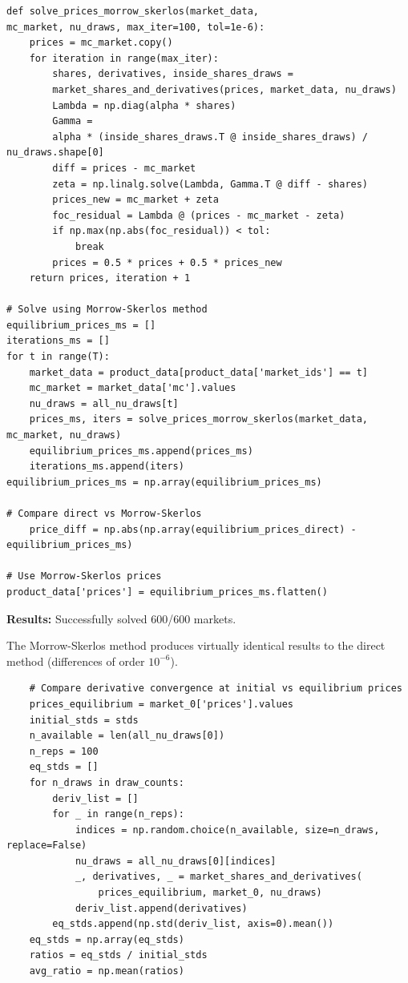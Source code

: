 \documentclass[english,11pt]{article}
\begin{document}
\begin{enumerate}
\begin{enumerate}
\begin{verbatim}
def solve_prices_morrow_skerlos(market_data,
mc_market, nu_draws, max_iter=100, tol=1e-6):
    prices = mc_market.copy()
    for iteration in range(max_iter):
        shares, derivatives, inside_shares_draws = 
        market_shares_and_derivatives(prices, market_data, nu_draws)
        Lambda = np.diag(alpha * shares)
        Gamma = 
        alpha * (inside_shares_draws.T @ inside_shares_draws) / nu_draws.shape[0]
        diff = prices - mc_market
        zeta = np.linalg.solve(Lambda, Gamma.T @ diff - shares)
        prices_new = mc_market + zeta
        foc_residual = Lambda @ (prices - mc_market - zeta)
        if np.max(np.abs(foc_residual)) < tol:
            break
        prices = 0.5 * prices + 0.5 * prices_new
    return prices, iteration + 1
    
# Solve using Morrow-Skerlos method
equilibrium_prices_ms = []
iterations_ms = []
for t in range(T):
    market_data = product_data[product_data['market_ids'] == t]
    mc_market = market_data['mc'].values
    nu_draws = all_nu_draws[t]
    prices_ms, iters = solve_prices_morrow_skerlos(market_data, mc_market, nu_draws)
    equilibrium_prices_ms.append(prices_ms)
    iterations_ms.append(iters)
equilibrium_prices_ms = np.array(equilibrium_prices_ms)

# Compare direct vs Morrow-Skerlos 
    price_diff = np.abs(np.array(equilibrium_prices_direct) - equilibrium_prices_ms)
    
# Use Morrow-Skerlos prices
product_data['prices'] = equilibrium_prices_ms.flatten()
\end{verbatim}


\textbf{Results:} Successfully solved 600/600 markets. 

The Morrow-Skerlos method produces virtually identical results to the direct method (differences of order $10^{-6}$).


\begin{verbatim}
    # Compare derivative convergence at initial vs equilibrium prices
    prices_equilibrium = market_0['prices'].values
    initial_stds = stds 
    n_available = len(all_nu_draws[0])
    n_reps = 100
    eq_stds = []
    for n_draws in draw_counts:
        deriv_list = []
        for _ in range(n_reps):
            indices = np.random.choice(n_available, size=n_draws, replace=False)
            nu_draws = all_nu_draws[0][indices]
            _, derivatives, _ = market_shares_and_derivatives(
                prices_equilibrium, market_0, nu_draws)
            deriv_list.append(derivatives)
        eq_stds.append(np.std(deriv_list, axis=0).mean())
    eq_stds = np.array(eq_stds)
    ratios = eq_stds / initial_stds
    avg_ratio = np.mean(ratios)
\end{verbatim}




\end{enumerate}
\end{enumerate}
\end{document}
